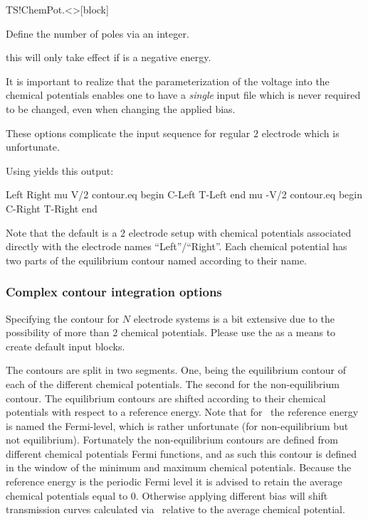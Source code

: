 \begin{fdfentry}{TS!ChemPot.<>}[block]
\begin{fdfoptions}

    Define the number of poles via an integer.
    
    \note this will only take effect if
     is a negative energy. 

  \end{fdfoptions}

  It is important to realize that the parameterization of the voltage
  into the chemical potentials enables one to have a \emph{single}
  input file which is never required to be changed, even when changing
  the applied bias.

\end{fdfentry}

These options complicate the input sequence for regular $2$ electrode
which is unfortunate. 

Using  yields this output:
\begin{fdfexample}
    Left
    Right
    mu V/2
    contour.eq
      begin
        C-Left
        T-Left
      end
    mu -V/2
    contour.eq
      begin
        C-Right
        T-Right
      end
\end{fdfexample}

Note that the default is a $2$ electrode setup with chemical
potentials associated directly with the electrode names
``Left''/``Right''. Each chemical potential has two parts of the
equilibrium contour named according to their name.



\subsubsection{Complex contour integration options}

Specifying the contour for $N$ electrode systems is a bit extensive
due to the possibility of more than 2 chemical potentials. Please use
the  as a means to create default input
blocks.

The contours are split in two segments. One, being the equilibrium
contour of each of the different chemical potentials. The second for
the non-equilibrium contour. The equilibrium contours are shifted
according to their chemical potentials with respect to a reference
energy. Note that for \tsiesta\ the reference energy is named the
Fermi-level, which is rather unfortunate (for non-equilibrium but not
equilibrium). Fortunately the non-equilibrium contours are defined
from different chemical potentials Fermi functions, and as such this
contour is defined in the window of the minimum and maximum chemical
potentials. Because the reference energy is the periodic Fermi level
it is advised to retain the average chemical potentials equal to
$0$. Otherwise applying different bias will shift transmission curves
calculated via \tbtrans\ relative to the average chemical potential.

